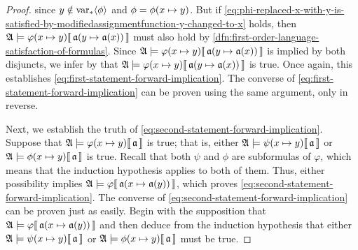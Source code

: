\begin{proof}
    since \( y \notin \operatorname{var}_{\ast} \langle\phi\rangle \) and \( \phi = \folfreevariablereplacement{\phi}{x}{y} \).
    But if \eqref{eq:phi-replaced-x-with-y-is-satisfied-by-modifiedassignmentfunction-y-changed-to-x} holds, then
    \( \folwffsatisfaction{\mathfrak{A}}{ \folfreevariablereplacement{\varphi}{x}{y} }{ \folmodifiedvariableassignmentfunction{\mathfrak{a}}{y}{\mathfrak{a}(x)} } \)
    must also hold by \cref{dfn:first-order-language-satisfaction-of-formulas}.
    Since
    \( \folwffsatisfaction{\mathfrak{A}}{ \folfreevariablereplacement{\varphi}{x}{y} }{ \folmodifiedvariableassignmentfunction{\mathfrak{a}}{y}{\mathfrak{a}(x)} } \)
    is implied by both disjuncts, we infer by  that
    \( \folwffsatisfaction{\mathfrak{A}}{ \folfreevariablereplacement{\varphi}{x}{y} }{ \folmodifiedvariableassignmentfunction{\mathfrak{a}}{y}{\mathfrak{a}(x)} } \)
    is true. Once again, this establishes \eqref{eq:first-statement-forward-implication}.
    The converse of \eqref{eq:first-statement-forward-implication} can be proven using the same argument, only in reverse.

    \vspace{0.3cm}
    \noindent
    Next, we establish the truth of \eqref{eq:second-statement-forward-implication}.
    Suppose that \( \folwffsatisfaction{\mathfrak{A}}{ \folfreevariablereplacement{\varphi}{x}{y} }{\mathfrak{a}} \) is true;
    that is, either \( \folwffsatisfaction{\mathfrak{A}}{ \folfreevariablereplacement{\psi}{x}{y} }{\mathfrak{a}} \)
    or \( \folwffsatisfaction{\mathfrak{A}}{ \folfreevariablereplacement{\phi}{x}{y} }{\mathfrak{a}} \) is true.
    Recall that both \( \psi \) and \( \phi \) are subformulas of \( \varphi \), which means that the induction hypothesis applies
    to both of them. Thus, either possibility implies
    \( \folwffsatisfaction{\mathfrak{A}}{\varphi}{ \folmodifiedvariableassignmentfunction{\mathfrak{a}}{x}{\mathfrak{a}(y)} } \), which proves
    \eqref{eq:second-statement-forward-implication}.
    The converse of \eqref{eq:second-statement-forward-implication} can be proven just as easily.
    Begin with the supposition that
    \( \folwffsatisfaction{\mathfrak{A}}{\varphi}{ \folmodifiedvariableassignmentfunction{\mathfrak{a}}{x}{\mathfrak{a}(y)} } \) and then
    deduce from the induction hypothesis that either \( \folwffsatisfaction{\mathfrak{A}}{ \folfreevariablereplacement{\psi}{x}{y} }{\mathfrak{a}} \) or
    \( \folwffsatisfaction{\mathfrak{A}}{ \folfreevariablereplacement{\phi}{x}{y} }{\mathfrak{a}} \) must be true.


\end{proof}
